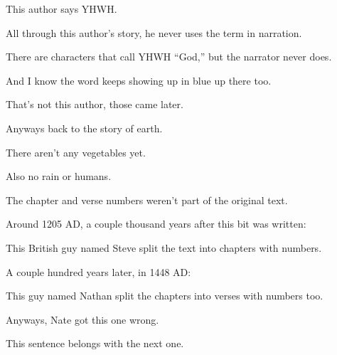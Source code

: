 {

}
{
}
{
	This author says YHWH.

	All through this author's story, he never uses the term  in narration.

	There are characters that call YHWH	``God,'' but the narrator never does.

	And I know the word  keeps showing up in blue up there too.

	That's not this author, those came later.

	Anyways back to the story of earth.

	There aren't any vegetables yet.

	Also no rain or humans.



}

{
}
{
}
{


	The chapter and verse numbers weren't part of the original text.

	Around 1205 AD, a couple thousand years after this bit was written:

	This British guy named Steve split the text into chapters with numbers.

	A couple hundred years later, in 1448 AD:

	This guy named Nathan split the chapters into verses with numbers too.

	Anyways, Nate got this one wrong.

	This sentence belongs with the next one.
}

